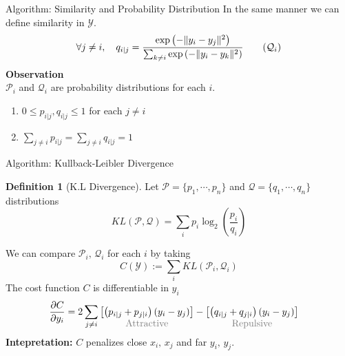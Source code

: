 \documentclass[10pt]{beamer}
\theoremstyle{definition}
\newtheorem{defn}{Definition}
\newcommand{\1}{\mathbbm{1}}
\newcommand{\YY}{\mathcal{Y}}
\newcommand{\PP}{\mathcal{P}}
\newcommand{\QQ}{\mathcal{Q}}
\begin{document}
\begin{frame}{Algorithm: Similarity and Probability Distribution}
  In the same manner we can define similarity in $\YY$.
  \begin{equation}
      \forall j\ne i,\quad q_{i|j}  = \frac{\exp\left(-\|y_i -
    y_j\|^2\right)}{\sum_{k\ne i}\exp\left(-\|y_i - y_k\|^2\right)}
    \tag{$\QQ_i$}
  \end{equation}
  \vfill
  {\bf Observation}\\
  $\PP_i$ and $\QQ_i$ are probability distributions  for each $i$.
  \begin{enumerate}
  \item $0 \le p_{i|j},q_{i|j} \le 1$ for each $j\ne i$
  \item $\sum_{j\ne i} p_{i|j} = \sum_{j\ne i} q_{i|j} = 1 $
\end{enumerate}
\end{frame}
\begin{frame}{Algorithm: Kullback-Leibler Divergence}{}
  \begin{defn}[K.L Divergence]
    \vspace{1px}
    Let $ \PP=\{p_1, \cdots, p_n\}$ and $\QQ=\{q_1,\cdots,q_n\}$  distributions
    \begin{equation}
      KL(\PP,\QQ) = \sum_i p_i\log_2\left( \frac{p_i}{q_i} \right)
    \end{equation}
  \end{defn}
  We can compare $\PP_i,\,\QQ_i$ for each $i$ by taking
  \begin{equation}
   C(\YY) := \sum_i KL(\PP_i,\QQ_i)
  \end{equation}
   The cost function $C$ is differentiable in $y_i$
  \begin{equation}
    \begin{aligned}
      \frac{\partial C}{\partial y_i} %
      &= 2\sum_{j\ne i} \underset{\mbox{\color{grey}Attractive}}{\left[\left( p_{i|j} + p_{j|i}
      \right)(y_i-y_j)\right]} - \underset{\mbox{\color{grey}Repulsive}}{\left[
          \left( q_{i|j}+q_{j|i}\right)\left( y_i-y_j \right)\right]}
    \end{aligned}
  \end{equation}
  {\bf Intepretation:} $C$ penalizes close $x_i,\,x_j$ and far $y_i,\,y_j$.
\end{frame}
\end{document}
